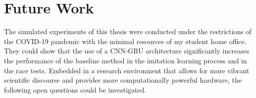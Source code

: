 







\section{Future Work}
The simulated experiments of this thesis were conducted under the restrictions of the COVID-19 pandemic 
with the minimal resources of my student home office. 
They could show that the use of a CNN-GRU architecture significantly increases 
the performance of the baseline method in the imitation learning process and in the race tests. 
Embedded in a research environment that allows for more vibrant scientific discourse 
and provides more computationally powerful hardware, the following open questions could be investigated.

